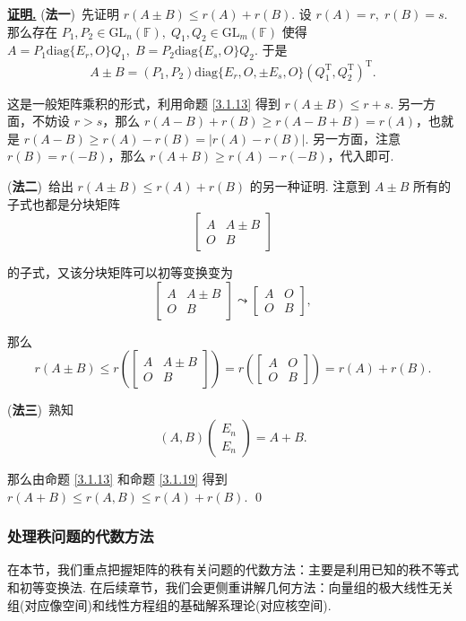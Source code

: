\documentclass[10pt,openany]{article}
\theoremstyle{thmstyle} %
\theoremstyle{defstyle} %
\theoremstyle{prostyle} %
\theoremstyle{exastyle}
\theoremstyle{remstyle}
\renewenvironment{proof}[1][证明]{\par\underline{\textbf{#1.}} \;\fangsong}{\qed\par}
\newcommand{\T}{^{\text{T}}}
\newcommand{\gfn}{\text{GL}_n(\mathbb{F})}
\newcommand{\gfm}{\text{GL}_m(\mathbb{F})}
\newcommand{\diag}{\mathrm{diag}}
\begin{document}
\begin{proof}
	(\textbf{法一})\ 先证明 \( r(A\pm B) \leq r(A)+r(B)  \). 设 \( r(A)=r, \; r(B)=s \). 那么存在 \( P_1,P_2 \in \gfn, \; Q_1,Q_2 \in \gfm \) 使得 \( A=P_1\diag\{E_r,O\}Q_1, \; B=P_2\diag\{E_s,O\}Q_2 \). 于是
	\[ A \pm B= (P_1,P_2)\diag\{E_r,O,\pm E_s,O\}(Q_1\T,Q_2\T)\T. \]
	
	这是一般矩阵乘积的形式，利用命题 \ref{3.1.13} 得到 \( r(A \pm B) \leq r+s \). 另一方面，不妨设 \( r>s \)，那么 \( r(A-B)+r(B) \geq r(A-B+B)=r(A) \)，也就是 \( r(A-B) \geq r(A)-r(B)=|r(A)-r(B)| \). 另一方面，注意 \( r(B)=r(-B) \)，那么 \( r(A+B) \geq r(A)-r(-B) \)，代入即可.
	
	(\textbf{法二})\ 给出 \( r(A\pm B) \leq r(A)+r(B)  \) 的另一种证明. 注意到 \( A \pm B \) 所有的子式也都是分块矩阵
	\[ \begin{bmatrix}
		A & A \pm B \\ O & B
	\end{bmatrix} \]
	
	的子式，又该分块矩阵可以初等变换变为
	\[ \begin{bmatrix}
		A & A \pm B \\ O & B
	\end{bmatrix} \leadsto \begin{bmatrix}
	A & O \\ O & B
	\end{bmatrix}, \]
	
	那么 
	\[ r(A\pm B) \leq r\left( \begin{bmatrix}
		A & A \pm B \\ O & B
	\end{bmatrix} \right)=r\left( \begin{bmatrix}
	A & O \\ O & B
	\end{bmatrix} \right)=r(A)+r(B). \]	 
	
	(\textbf{法三})\ 熟知
	\[ (A,B)\begin{pmatrix}
		E_n \\ E_n
	\end{pmatrix}=A+B. \]
	
	那么由命题 \ref{3.1.13} 和命题 \ref{3.1.19} 得到 \( r(A+B) \leq r(A,B) \leq r(A)+r(B) \).
\end{proof}


\subsubsection{处理秩问题的代数方法}

在本节，我们重点把握矩阵的秩有关问题的代数方法：主要是利用已知的秩不等式和初等变换法. 在后续章节，我们会更侧重讲解几何方法：向量组的极大线性无关组(对应像空间)和线性方程组的基础解系理论(对应核空间).
\end{document}
